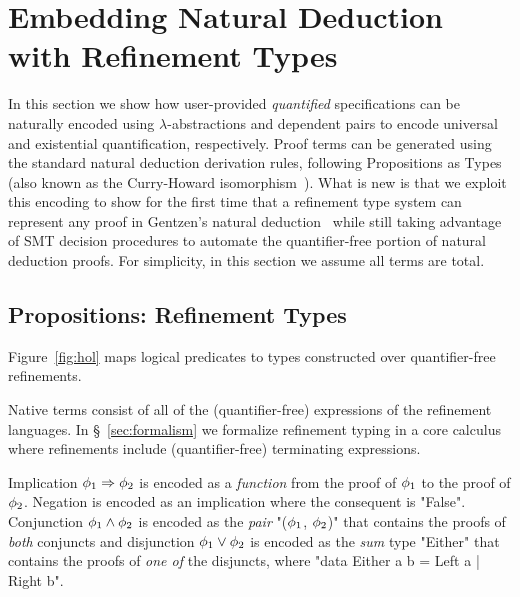 \newcommand\expror[2]{\ensuremath{\texttt{Either}\ #1\ #2}\xspace}
\newcommand\exprand[2]{\ensuremath{(#1, #2)}\xspace}
\newcommand\exprorleft[1]{\ensuremath{\texttt{Left}\ #1}\xspace}
\newcommand\exprorright[1]{\ensuremath{\texttt{Right}\ #1}\xspace}
\newcommand\tyand[2]{\ensuremath{(#1, #2)}\xspace}
\newcommand\tyor[2]{\ensuremath{\texttt{Either}\ #1\ #2}\xspace}
\newcommand\tyex[3]{\ensuremath{(#1::#2,#3)}\xspace}
\newcommand\tyall[3]{\ensuremath{#1:#2 \rightarrow #3}\xspace}

\section{Embedding Natural Deduction with Refinement Types}
\label{sec:higher-order}

In this section we show how user-provided
\emph{quantified} specifications
can be naturally encoded using
$\lambda$-abstractions and
dependent pairs to encode
universal and existential
quantification, respectively.
Proof terms can be generated
using the standard natural
deduction derivation rules,
following Propositions as Types~\cite{Wadler15}
(also known as the Curry-Howard
isomorphism~\cite{CHIso}).
%
What is new is that we exploit this encoding to show for the first time that a refinement
type system can represent any proof
in Gentzen's natural deduction~\cite{Gentzen35}
while still taking advantage of
SMT decision procedures to automate the
quantifier-free portion of natural
deduction proofs.
%
For simplicity, in this section we assume
all terms are total.

\subsection{Propositions: Refinement Types}

Figure~\ref{fig:hol} maps logical predicates
to types constructed over quantifier-free refinements.

%
Native terms consist of all of the
(quantifier-free) expressions
of the refinement languages.
%
In \S~\ref{sec:formalism}
we formalize refinement typing
in a core calculus \corelan where
refinements include (quantifier-free)
terminating expressions.


Implication $\phi_1 \Rightarrow \phi_2$
is encoded as a \emph{function} from the proof of
$\phi_1$ to the proof of $\phi_2$.
%
Negation is encoded as an implication where
the consequent is "False".
%
Conjunction $\phi_1 \land \phi_2$
is encoded as the \emph{pair} "($\phi_1$, $\phi_2$)"
that contains the proofs of \emph{both} conjuncts
%
and disjunction $\phi_1 \lor \phi_2$
is encoded as the \emph{sum} type "Either"
that contains the proofs of \emph{one of}
the disjuncts, \ie where "data Either a b = Left a | Right b".

